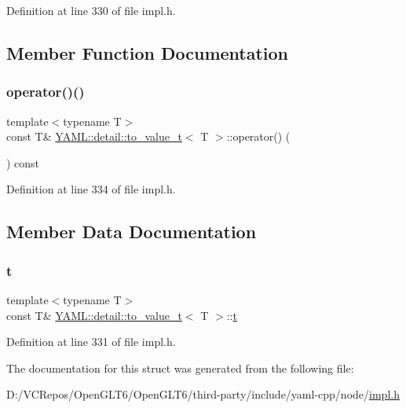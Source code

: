 Definition at line 330 of file impl.\+h.



\subsection{Member Function Documentation}
\mbox{\label{struct_y_a_m_l_1_1detail_1_1to__value__t_a46c8b856417caab314100d558830ebd5}} 
\subsubsection{\texorpdfstring{operator()()}{operator()()}}
{\footnotesize\ttfamily template$<$typename T$>$ \\
const T\& \mbox{\hyperlink{struct_y_a_m_l_1_1detail_1_1to__value__t}{Y\+A\+M\+L\+::detail\+::to\+\_\+value\+\_\+t}}$<$ T $>$\+::operator() (\begin{DoxyParamCaption}{ }\end{DoxyParamCaption}) const\hspace{0.3cm}{\ttfamily [inline]}}



Definition at line 334 of file impl.\+h.



\subsection{Member Data Documentation}
\mbox{\label{struct_y_a_m_l_1_1detail_1_1to__value__t_ab10b31733447ebf0e282f7500734e09b}} 
\subsubsection{\texorpdfstring{t}{t}}
{\footnotesize\ttfamily template$<$typename T$>$ \\
const T\& \mbox{\hyperlink{struct_y_a_m_l_1_1detail_1_1to__value__t}{Y\+A\+M\+L\+::detail\+::to\+\_\+value\+\_\+t}}$<$ T $>$\+::\mbox{\hyperlink{glad_8h_aef9f00bf06d58b8db7e501e287488401}{t}}}



Definition at line 331 of file impl.\+h.



The documentation for this struct was generated from the following file\+:\begin{DoxyCompactItemize}
\item 
D\+:/\+V\+C\+Repos/\+Open\+G\+L\+T6/\+Open\+G\+L\+T6/third-\/party/include/yaml-\/cpp/node/\mbox{\hyperlink{impl_8h}{impl.\+h}}\end{DoxyCompactItemize}
